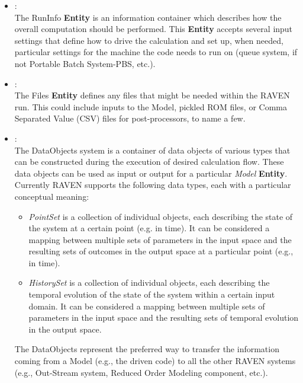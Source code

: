 \begin{itemize}
  \item \textit{}:
    \\The RunInfo \textbf{Entity} is an information container which describes how the overall computation should
      be performed. This \textbf{Entity}  accepts several input settings that define how to drive the calculation and set up,
      when needed, particular settings for the machine the code needs to run on (queue system, if not Portable Batch System-PBS, etc.).
  \item \textit{}:
  \\ The Files \textbf{Entity}  defines any files that might be needed within the RAVEN run. This could include inputs to the
      Model, pickled ROM files, or Comma Separated Value (CSV) files for post-processors, to name a few.
  \item \textit{}:
    \\The DataObjects system is a container of data objects of various types that can be constructed during the execution of
    desired calculation flow. These data objects can be used as input or output for a particular \textit{Model}
     \textbf{Entity}. Currently RAVEN supports the following data types, each with a particular conceptual meaning:
     \begin{itemize}
        \item \textit{PointSet} is a collection of individual objects, each describing the state of the system at
                                a certain point (e.g. in time). It can be considered a mapping between multiple
                                            sets of parameters in the input space and the resulting sets of outcomes in the output space
                                            at a particular point (e.g., in time).
        \item \textit{HistorySet} is a collection of individual objects, each describing the temporal evolution of the
                                  state of the system within a certain input domain. It can be considered a mapping between
                                               multiple sets of parameters in the input space and the resulting sets of temporal evolution
                                               in the output space.
     \end{itemize}
     The DataObjects represent the preferred way to transfer the information coming from a Model (e.g., the driven code) to
      all the other RAVEN systems (e.g., Out-Stream system, Reduced Order Modeling component, etc.).

\end{itemize}
